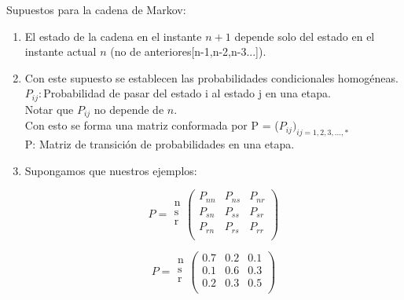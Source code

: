 \documentclass{templateNote}
\begin{document}
\noindent Supuestos para la cadena de Markov:
\begin{enumerate}
    \item El estado de la cadena en el instante $n+1$ depende solo del estado en el instante actual $n$ (no de anteriores[n-1,n-2,n-3...]).
    \item Con este supuesto se establecen las probabilidades condicionales homogéneas.\\
    $P_{ij}: $Probabilidad de pasar del estado i al estado j en una etapa. \\
    Notar que $P_{ij}$ no depende de $n$. \\
    Con esto se forma una matriz conformada por P = ($P_{ij})_{ij=1,2,3,...,*}$ \\
    P: Matriz de transición de probabilidades en una etapa.
    \item Supongamos que nuestros ejemplos:
    
    \begin{center}
        \[
        P =
        \begin{array}{l}
        \text{n} \\
        \text{s} \\
        \text{r} \\
        \end{array}
        \left(
        \begin{array}{ccc}
        P_{nn} & P_{ns} & P_{nr} \\
        P_{sn} & P_{ss} & P_{sr} \\
        P_{rn} & P_{rs} & P_{rr} \\
        \end{array}
        \right)
        \]
    \end{center}
    
    \begin{center}
        \[
        P = 
        \begin{array}{l}
        \text{n} \\
        \text{s} \\
        \text{r} \\
        \end{array}
        \left(
        \begin{array}{ccc}
        0.7 & 0.2 & 0.1 \\
        0.1 & 0.6 & 0.3 \\
        0.2 & 0.3 & 0.5 \\
        \end{array}
        \right)
        \]
    \end{center}


\end{enumerate}
\end{document}

